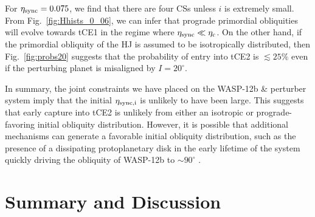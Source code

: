 \documentclass[
        fleqn,
        usenatbib,
    ]{mnras}
\begin{document}
For $\eta_{\rm sync} = 0.075$, we find that there are four CSs unless $i$ is
extremely small. From Fig.~\ref{fig:Hhists_0_06}, we can infer that prograde
primordial obliquities will evolve towards tCE1 in the regime where $\eta_{\rm
sync} \ll \eta_{\rm c}$. On the other hand, if the primordial obliquity of the
HJ is assumed to be isotropically distributed, then Fig.~\ref{fig:probs20}
suggests that the probability of entry into tCE2 is $\lesssim 25\%$ even if
the perturbing planet is misaligned by $I = 20^\circ$.

In summary, the joint constraints we have placed on the WASP-12b \& perturber
system imply that the initial $\eta_{\rm sync, i}$ is unlikely to have been
large. This suggests that early capture into tCE2 is unlikely from either an
isotropic or prograde-favoring initial obliquity distribution. However, it is
possible that additional mechanisms can generate a favorable initial obliquity
distribution, such as the presence of a dissipating protoplanetary disk in the
early lifetime of the system quickly driving the obliquity of WASP-12b to $\sim
90^\circ$ \citep{millholland_disk, su2020}.

\section{Summary and Discussion}\label{s:summary}
\end{document}
